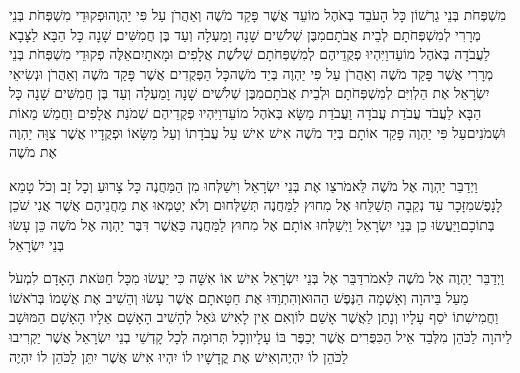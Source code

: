 \documentclass[../main/main.tex]{subfiles}
\begin{document}
\begin{multicols*}{\ncols}
מִשְׁפְּחֹת בְּנֵי גֵרְשׁוֹן כָּל הָעֹבֵד בְּאֹהֶל מוֹעֵד אֲשֶׁר פָּקַד מֹשֶׁה וְאַהֲרֹן עַל פִּי יַהְוֶה\PreVerseSpace{}וּפְקוּדֵי מִשְׁפְּחֹת בְּנֵי מְרָרִי לְמִשְׁפְּחֹתָם לְבֵית אֲבֹתָם\PreVerseSpace{}מִבֶּן שְׁלֹשִׁים שָׁנָה וָמַעְלָה וְעַד בֶּן חֲמִשִּׁים שָׁנָה כָּל הַבָּא לַצָּבָא לַעֲבֹדָה בְּאֹהֶל מוֹעֵד\PreVerseSpace{}וַיִּהְיוּ פְקֻדֵיהֶם לְמִשְׁפְּחֹתָם שְׁלֹשֶׁת אֲלָפִים וּמָאתָיִם\PreVerseSpace{}אֵלֶּה פְקוּדֵי מִשְׁפְּחֹת בְּנֵי מְרָרִי אֲשֶׁר פָּקַד מֹשֶׁה וְאַהֲרֹן עַל פִּי יַהְוֶה בְּיַד מֹשֶׁה\PreVerseSpace{}כָּל הַפְּקֻדִים אֲשֶׁר פָּקַד מֹשֶׁה וְאַהֲרֹן וּנְשִׂיאֵי יִשְׂרָאֵל אֶת הַלְוִיִּם לְמִשְׁפְּחֹתָם וּלְבֵית אֲבֹתָם\PreVerseSpace{}מִבֶּן שְׁלֹשִׁים שָׁנָה וָמַעְלָה וְעַד בֶּן חֲמִשִּׁים שָׁנָה כָּל הַבָּא לַעֲבֹד עֲבֹדַת עֲבֹדָה וַעֲבֹדַת מַשָּׂא בְּאֹהֶל מוֹעֵד\PreVerseSpace{}וַיִּהְיוּ פְּקֻדֵיהֶם שְׁמֹנַת אֲלָפִים וַחֲמֵשׁ מֵאוֹת וּשְׁמֹנִים\PreVerseSpace{}עַל פִּי יַהְוֶה פָּקַד אוֹתָם בְּיַד מֹשֶׁה אִישׁ אִישׁ עַל עֲבֹדָתוֹ וְעַל מַשָּׂאוֹ וּפְקֻדָיו אֲשֶׁר צִוָּה יַהְוֶה אֶת מֹשֶׁה\OpenSection{}\par
{}וַיְדַבֵּר יַהְוֶה אֶל מֹשֶׁה לֵּאמֹר\PreVerseSpace{}צַו אֶת בְּנֵי יִשְׂרָאֵל וִישַׁלְּחוּ מִן הַמַּחֲנֶה כָּל צָרוּעַ וְכָל זָב וְכֹל טָמֵא לָנָפֶשׁ\PreVerseSpace{}מִזָּכָר עַד נְקֵבָה תְּשַׁלֵּחוּ אֶל מִחוּץ לַמַּחֲנֶה תְּשַׁלְּחוּם וְלֹא יְטַמְּאוּ אֶת מַחֲנֵיהֶם אֲשֶׁר אֲנִי שֹׁכֵן בְּתוֹכָם\PreVerseSpace{}וַיַּעֲשׂוּ כֵן בְּנֵי יִשְׂרָאֵל וַיְשַׁלְּחוּ אוֹתָם אֶל מִחוּץ לַמַּחֲנֶה כַּאֲשֶׁר דִּבֶּר יַהְוֶה אֶל מֹשֶׁה כֵּן עָשׂוּ בְּנֵי יִשְׂרָאֵל\OpenSection{}\par
{}וַיְדַבֵּר יַהְוֶה אֶל מֹשֶׁה לֵּאמֹר\PreVerseSpace{}דַּבֵּר אֶל בְּנֵי יִשְׂרָאֵל אִישׁ אוֹ אִשָּׁה כִּי יַעֲשׂוּ מִכָּל חַטֹּאת הָאָדָם לִמְעֹל מַעַל בַּיהוָה וְאָשְׁמָה הַנֶּפֶשׁ הַהוּא\PreVerseSpace{}וְהִתְוַדּוּ אֶת חַטָּאתָם אֲשֶׁר עָשׂוּ וְהֵשִׁיב אֶת אֲשָׁמוֹ בְּרֹאשׁוֹ וַחֲמִישִׁתוֹ יֹסֵף עָלָיו וְנָתַן לַאֲשֶׁר אָשַׁם לוֹ\PreVerseSpace{}וְאִם אֵין לָאִישׁ גֹּאֵל לְהָשִׁיב הָאָשָׁם אֵלָיו הָאָשָׁם הַמּוּשָׁב לַיהוָה לַכֹּהֵן מִלְּבַד אֵיל הַכִּפֻּרִים אֲשֶׁר יְכַפֶּר בּוֹ עָלָיו\PreVerseSpace{}וְכָל תְּרוּמָה לְכָל קָדְשֵׁי בְנֵי יִשְׂרָאֵל אֲשֶׁר יַקְרִיבוּ לַכֹּהֵן לוֹ יִהְיֶה\PreVerseSpace{}וְאִישׁ אֶת קֳדָשָׁיו לוֹ יִהְיוּ אִישׁ אֲשֶׁר יִתֵּן לַכֹּהֵן לוֹ יִהְיֶה\OpenSection{}\par

\end{multicols*}
\end{document}
